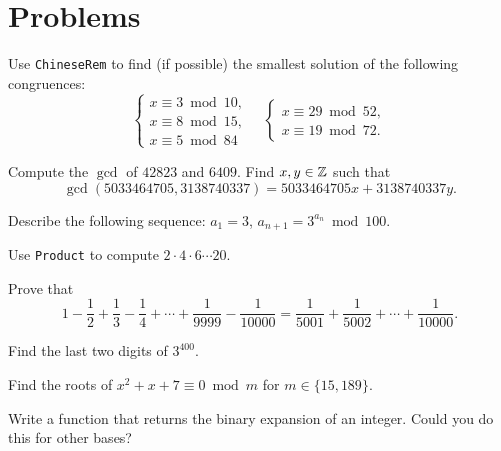 \section{Problems}

\begin{prob}
	\label{prob:chinese}
	Use \lstinline{ChineseRem} to find (if possible) the smallest solution of
	the following congruences:
	\[
		\begin{cases}
		x\equiv 3\bmod 10,\\
		x\equiv 8\bmod 15,\\
		x\equiv 5\bmod 84
	\end{cases}
	\quad
	\begin{cases}
		x\equiv 29\bmod 52,\\
		x\equiv 19\bmod 72.
	\end{cases}
	\]
\end{prob}

\begin{prob}
	\label{prob:gcd}
	Compute the $\gcd$ of $42823$ and $6409$. 
	Find $x,y\in\mathbb{Z}$ such that
	\[
	\gcd(5033464705,3138740337)=5033464705x+3138740337y. 
	\]
\end{prob}

\begin{prob}
	\label{prob:sequence}
	Describe the following sequence: $a_1=3$, $a_{n+1}=3^{a_n}\bmod 100$.
\end{prob}

\begin{prob}
	\label{prob:product}
    Use \lstinline{Product} to compute $2\cdot 4\cdot 6\cdots
    20$. 
\end{prob}

\begin{prob}
	\label{prob:2sums}
	Prove that
	\[
	1-\frac12+\frac13-\frac14+\cdots+\frac{1}{9999}-\frac{1}{10000}=
	\frac{1}{5001}+\frac{1}{5002}+\cdots+\frac{1}{10000}.
	\]
\end{prob}

\begin{prob}
	\label{prob:last2}
	Find the last two digits of $3^{400}$.
\end{prob}

\begin{prob}
	\label{prob:congruence}
	Find the roots of $x^2+x+7\equiv 0\bmod m$ for $m\in\{15,189\}$.
\end{prob}

\begin{prob}
	\label{prob:binary}
	Write a function that returns the binary expansion of an integer. Could you
	do this for other bases?
\end{prob}

